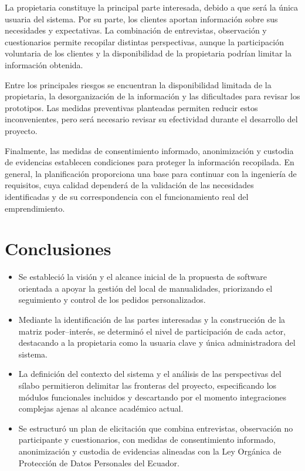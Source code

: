 \documentclass[11pt,a4paper]{article}
\begin{document}
	La propietaria constituye la principal parte interesada, debido a que será la única usuaria del sistema. Por su parte, los clientes aportan información sobre sus necesidades y expectativas. La combinación de entrevistas, observación y cuestionarios permite recopilar distintas perspectivas, aunque la participación voluntaria de los clientes y la disponibilidad de la propietaria podrían limitar la información obtenida.
	
	Entre los principales riesgos se encuentran la disponibilidad limitada de la propietaria, la desorganización de la información y las dificultades para revisar los prototipos. Las medidas preventivas planteadas permiten reducir estos inconvenientes, pero será necesario revisar su efectividad durante el desarrollo del proyecto.
	
	Finalmente, las medidas de consentimiento informado, anonimización y custodia de evidencias establecen condiciones para proteger la información recopilada. En general, la planificación proporciona una base para continuar con la ingeniería de requisitos, cuya calidad dependerá de la validación de las necesidades identificadas y de su correspondencia con el funcionamiento real del emprendimiento.
	
	
	
	\section{Conclusiones}
	
	\begin{itemize}
		\item Se estableció la visión y el alcance inicial de la propuesta de software orientada a apoyar la gestión del local de manualidades, priorizando el seguimiento y control de los pedidos personalizados.
		\item Mediante la identificación de las partes interesadas y la construcción de la matriz poder--interés, se determinó el nivel de participación de cada actor, destacando a la propietaria como la usuaria clave y única administradora del sistema.
		\item La definición del contexto del sistema y el análisis de las perspectivas del sílabo permitieron delimitar las fronteras del proyecto, especificando los módulos funcionales incluidos y descartando por el momento integraciones complejas ajenas al alcance académico actual.
		\item Se estructuró un plan de elicitación que combina entrevistas, observación no participante y cuestionarios, con medidas de consentimiento informado, anonimización y custodia de evidencias alineadas con la Ley Orgánica de Protección de Datos Personales del Ecuador.
	\end{itemize}
	
\end{document}
